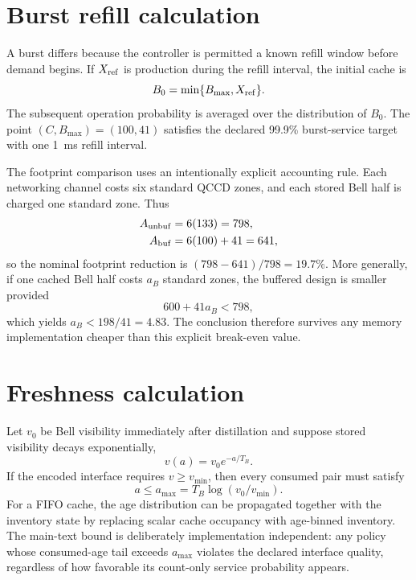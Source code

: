 \documentclass[aps,prx,preprint,superscriptaddress,nofootinbib,longbibliography]{revtex4-2}
\begin{document}
\section{Burst refill calculation}
A burst differs because the controller is permitted a known refill window before demand begins. If $X_{\rm ref}$ is production during the refill interval, the initial cache is
\begin{equation}
 B_0=\min\{B_{\max},X_{\rm ref}\}.
\end{equation}
The subsequent operation probability is averaged over the distribution of $B_0$. The point $(C,B_{\max})=(100,41)$ satisfies the declared 99.9\% burst-service target with one \SI{1}{ms} refill interval.

The footprint comparison uses an intentionally explicit accounting rule. Each networking channel costs six standard QCCD zones, and each stored Bell half is charged one standard zone. Thus
\begin{align}
 A_{\rm unbuf}&=6(133)=798,\\
 A_{\rm buf}&=6(100)+41=641,
\end{align}
so the nominal footprint reduction is $(798-641)/798=19.7\%$. More generally, if one cached Bell half costs $a_B$ standard zones, the buffered design is smaller provided
\begin{equation}
 600+41a_B<798,
\end{equation}
which yields $a_B<198/41=4.83$. The conclusion therefore survives any memory implementation cheaper than this explicit break-even value.

\section{Freshness calculation}
Let $v_0$ be Bell visibility immediately after distillation and suppose stored visibility decays exponentially,
\begin{equation}
 v(a)=v_0e^{-a/T_B}.
\end{equation}
If the encoded interface requires $v\ge v_{\min}$, then every consumed pair must satisfy
\begin{equation}
 a\le a_{\max}=T_B\log(v_0/v_{\min}).
\end{equation}
For a FIFO cache, the age distribution can be propagated together with the inventory state by replacing scalar cache occupancy with age-binned inventory. The main-text bound is deliberately implementation independent: any policy whose consumed-age tail exceeds $a_{\max}$ violates the declared interface quality, regardless of how favorable its count-only service probability appears.
\end{document}
